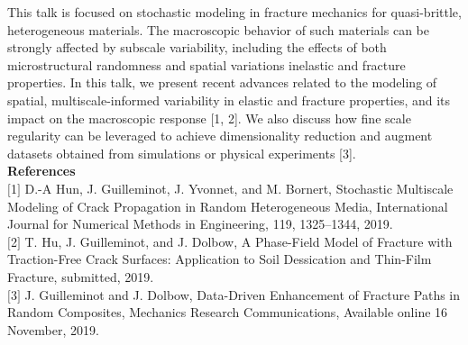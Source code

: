 This talk is focused on stochastic modeling in fracture mechanics for quasi-brittle, heterogeneous materials. The macroscopic behavior of such materials can be strongly affected by subscale variability, including the effects of both microstructural randomness and spatial variations inelastic and fracture properties. In this talk, we present recent advances related to the modeling of spatial, multiscale-informed variability in elastic and fracture properties, and its impact on the macroscopic response [1, 2]. We also discuss how fine scale regularity can be leveraged to achieve dimensionality reduction and augment datasets obtained from simulations or physical experiments [3].\\

\noindent\textbf{References}\\
$[$1$]$ D.-A Hun, J. Guilleminot, J. Yvonnet, and M. Bornert, Stochastic Multiscale Modeling of Crack Propagation in Random Heterogeneous Media, International Journal for Numerical Methods in Engineering, 119, 1325–1344, 2019. \\\newline
$[$2$]$ T. Hu, J. Guilleminot, and J. Dolbow, A Phase-Field Model of Fracture with Traction-Free Crack Surfaces: Application to Soil Dessication and Thin-Film Fracture, submitted, 2019. \\\newline
$[$3$]$ J. Guilleminot and J. Dolbow, Data-Driven Enhancement of Fracture Paths in Random Composites, Mechanics Research Communications, Available online 16 November, 2019.